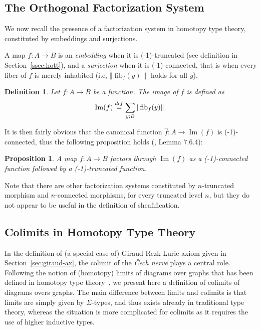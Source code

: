 \documentclass[conference]{IEEEtran}
\newtheorem{prop}[thm]{Proposition}
\newtheorem{defi}[thm]{Definition}
\newcommand \defeq {\overset{de\hspace{-0.2ex}f}{=}}
\newcommand{\ie}{i.e,\xspace}
\DeclareMathOperator{\im}{Im}
\newcommand \fib[2] {\mathrm{fib}_{#1}(#2)}
\begin{document}
\subsection{The Orthogonal Factorization System}
\label{sec:epi-mono-fact}

We now recall the presence of a factorization system in homotopy type
theory, constituted by embeddings and surjections.

A map $f:A\to B$ is an \emph{embedding} when it is (-1)-truncated
(see definition in Section~\ref{ssec:hott}), and a \emph{surjection}
when it is (-1)-connected, that is when every fiber of $f$ is merely
inhabited (\ie $\|\fib f y\|$ holds for all $y$).

\begin{defi}
  Let $f:A\to B$ be a function. The {\em image} of $f$ is defined as 
  $$\im(f) \defeq \sum_{y:B} \|\fib f y\|.$$
\end{defi}

It is then fairly obvious that the canonical function $\hat f : A \to
\im(f)$ is (-1)-connected, thus the following proposition holds
(\cite{hottbook}, Lemma 7.6.4):
\begin{prop}
  A map $f:A\to B$ factors through $\im(f)$ as a (-1)-connected
  function followed by a (-1)-truncated function.
\end{prop}

Note that there are other factorization systems constituted by
$n$-truncated morphism and $n$-connected morphisms, for every
truncated level $n$, but they do not appear to be useful in the
definition of sheafification.

\subsection{Colimits in Homotopy Type Theory }
\label{sec:colim-homot-type}

In the definition of (a special case of) Giraud-Rezk-Lurie axiom given in
Section~\ref{sec:giraud-ax}, the colimit of the {\em \v{C}ech nerve}
plays a central role.
% 
Following the notion of (homotopy) limits of diagrams over graphs that
has been defined in homotopy type theory~\cite{lumsdaine}, we present
here a definition of colimits of diagrams overs graphs. 
%
The main difference between limits and colimits is that limits are
simply given by $\Sigma$-types, and thus exists already in traditional
type theory, whereas the situation is more complicated for colimits as
it requires the use of higher inductive types.
\end{document}
